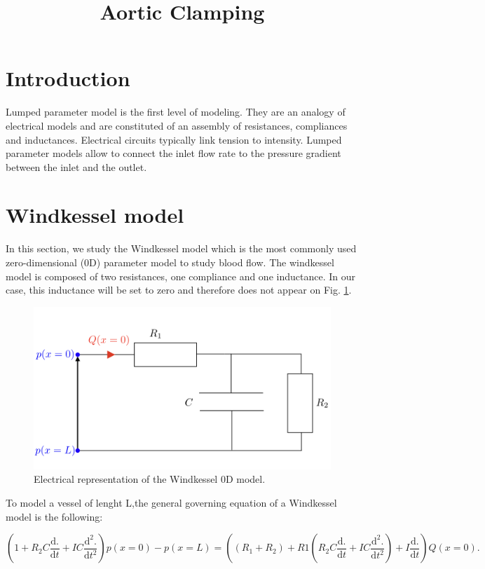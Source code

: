 \documentclass{config}
\title{Aortic Clamping}
\begin{document}
\maketitle
\section{Introduction}

Lumped parameter model is the first level of modeling. They are an analogy of electrical models and are constituted of an assembly of resistances, compliances and inductances. Electrical circuits typically link tension to intensity. Lumped parameter models allow to connect the inlet flow rate to the pressure gradient between the inlet and the outlet. 

\section{Windkessel model}

In this section, we study the Windkessel model which is the most commonly used zero-dimensional (0D) parameter model to study blood flow. The windkessel model is composed of two resistances, one compliance and one inductance. In our case, this inductance will be set to zero and therefore does not appear on Fig. \ref{windkessel_schema}.

\begin{figure}[H]
\centering
\includegraphics[scale=0.3]{Figures/resistance.png}
\caption{Electrical representation of the Windkessel 0D model.}
\label{windkessel_schema}
\end{figure}

To model a vessel of lenght L,the general governing equation of a Windkessel model is the following:

\begin{equation}\label{windkessel_equation}
\left(1+ R_2 C \frac{\mathrm{d} .}{\mathrm{d}t} + I C \frac{\mathrm{d}^2 .}{\mathrm{d}t^2}\right) p(x=0) - p(x=L) =  \left( (R_1 + R_2) + R1 \left( R_2 C \frac{\mathrm{d}.}{\mathrm{d}t} + IC \frac{\mathrm{d}^2 .}{\mathrm{d}t^2}\right) + I \frac{\mathrm{d}.}{\mathrm{d}t}\right) Q(x=0).
\end{equation}
\end{document}
